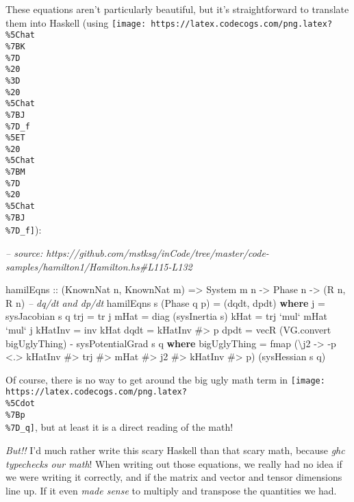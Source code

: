 \documentclass[]{article}
\newenvironment{Shaded}{}{}
\newcommand{\CommentTok}[1]{\textcolor[rgb]{0.38,0.63,0.69}{\textit{#1}}}
\newcommand{\DataTypeTok}[1]{\textcolor[rgb]{0.56,0.13,0.00}{#1}}
\newcommand{\FunctionTok}[1]{\textcolor[rgb]{0.02,0.16,0.49}{#1}}
\newcommand{\KeywordTok}[1]{\textcolor[rgb]{0.00,0.44,0.13}{\textbf{#1}}}
\newcommand{\NormalTok}[1]{#1}
\newcommand{\OtherTok}[1]{\textcolor[rgb]{0.00,0.44,0.13}{#1}}
\begin{document}
These equations aren't particularly beautiful, but it's straightforward to
translate them into Haskell (using
\texttt{[image: https://latex.codecogs.com/png.latex?\\\%5Chat\\\%7BK\\\%7D\\\%20\\\%3D\\\%20\\\%5Chat\\\%7BJ\\\%7D\_f\\\%5ET\\\%20\\\%5Chat\\\%7BM\\\%7D\\\%20\\\%5Chat\\\%7BJ\\\%7D\_f]}):

\begin{Shaded}
\begin{Highlighting}[]
\CommentTok{-- source: https://github.com/mstksg/inCode/tree/master/code-samples/hamilton1/Hamilton.hs#L115-L132}

\NormalTok{hamilEqns}
\OtherTok{    ::}\NormalTok{ (}\DataTypeTok{KnownNat}\NormalTok{ n, }\DataTypeTok{KnownNat}\NormalTok{ m)}
    \OtherTok{=>} \DataTypeTok{System}\NormalTok{ m n}
    \OtherTok{->} \DataTypeTok{Phase}\NormalTok{ n}
    \OtherTok{->}\NormalTok{ (}\DataTypeTok{R}\NormalTok{ n, }\DataTypeTok{R}\NormalTok{ n)       }\CommentTok{-- dq/dt and dp/dt}
\NormalTok{hamilEqns s (}\DataTypeTok{Phase}\NormalTok{ q p) }\FunctionTok{=}\NormalTok{ (dqdt, dpdt)}
  \KeywordTok{where}
\NormalTok{    j       }\FunctionTok{=}\NormalTok{ sysJacobian s q}
\NormalTok{    trj     }\FunctionTok{=}\NormalTok{ tr j}
\NormalTok{    mHat    }\FunctionTok{=}\NormalTok{ diag (sysInertia s)}
\NormalTok{    kHat    }\FunctionTok{=}\NormalTok{ trj }\OtherTok{`mul`}\NormalTok{ mHat }\OtherTok{`mul`}\NormalTok{ j}
\NormalTok{    kHatInv }\FunctionTok{=}\NormalTok{ inv kHat}
\NormalTok{    dqdt    }\FunctionTok{=}\NormalTok{ kHatInv }\FunctionTok{#>}\NormalTok{ p}
\NormalTok{    dpdt    }\FunctionTok{=}\NormalTok{ vecR (VG.convert bigUglyThing) }\FunctionTok{-}\NormalTok{ sysPotentialGrad s q}
      \KeywordTok{where}
\NormalTok{        bigUglyThing }\FunctionTok{=}
\NormalTok{          fmap (\textbackslash{}j2 }\OtherTok{->} \FunctionTok{-}\NormalTok{p }\FunctionTok{<.>}\NormalTok{ kHatInv }\FunctionTok{#>}\NormalTok{ trj }\FunctionTok{#>}\NormalTok{ mHat }\FunctionTok{#>}\NormalTok{ j2 }\FunctionTok{#>}\NormalTok{ kHatInv }\FunctionTok{#>}\NormalTok{ p)}
\NormalTok{               (sysHessian s q)}
\end{Highlighting}
\end{Shaded}

Of course, there is no way to get around the big ugly math term in
\texttt{[image: https://latex.codecogs.com/png.latex?\\\%5Cdot\\\%7Bp\\\%7D\_q]}, but
at least it is a direct reading of the math!

\emph{But!!} I'd much rather write this scary Haskell than that scary math,
because \emph{ghc typechecks our math}! When writing out those equations, we
really had no idea if we were writing it correctly, and if the matrix and vector
and tensor dimensions line up. If it even \emph{made sense} to multiply and
transpose the quantities we had.
\end{document}

